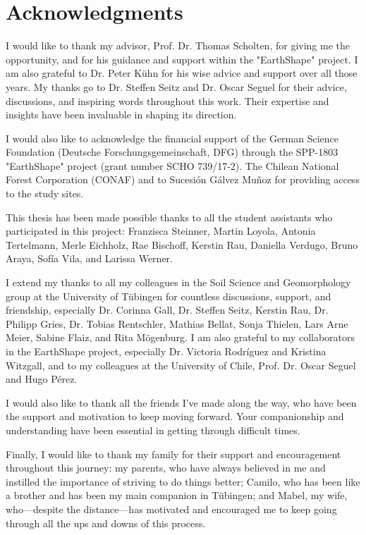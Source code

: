 \chapter*{Acknowledgments}

I would like to thank my advisor, Prof. Dr. Thomas Scholten, for giving me the opportunity, and for his guidance and support within the "EarthShape" project. I am also grateful to Dr. Peter Kühn for his wise advice and support over all those years. My thanks go to Dr. Steffen Seitz and Dr. Oscar Seguel for their advice, discussions, and inspiring words throughout this work. Their expertise and insights have been invaluable in shaping its direction.

I would also like to acknowledge the financial support of the German Science Foundation (Deutsche Forschungsgemeinschaft, DFG) through the SPP-1803 "EarthShape" project (grant number SCHO 739/17-2). The Chilean National Forest Corporation (CONAF) and to Sucesión Gálvez Muñoz for providing access to the study sites.

This thesis has been made possible thanks to all the student assistants who participated in this project: Franzisca Steinner, Martin Loyola, Antonia Tertelmann, Merle Eichholz, Rae Bischoff, Kerstin Rau, Daniella Verdugo, Bruno Araya, Sofía Vila, and Larissa Werner.

I extend my thanks to all my colleagues in the Soil Science and Geomorphology group at the University of Tübingen for countless discussions, support, and friendship, especially Dr. Corinna Gall, Dr. Steffen Seitz, Kerstin Rau, Dr. Philipp Gries, Dr. Tobias Rentschler, Mathias Bellat, Sonja Thielen, Lars Arne Meier, Sabine Flaiz, and Rita Mögenburg. I am also grateful to my collaborators in the EarthShape project, especially Dr. Victoria Rodríguez and Kristina Witzgall, and to my colleagues at the University of Chile, Prof. Dr. Oscar Seguel and Hugo Pérez.

I would also like to thank all the friends I've made along the way, who have been the support and motivation to keep moving forward. Your companionship and understanding have been essential in getting through difficult times.

Finally, I would like to thank my family for their support and encouragement throughout this journey: my parents, who have always believed in me and instilled the importance of striving to do things better; Camilo, who has been like a brother and has been my main companion in Tübingen; and Mabel, my wife, who—despite the distance—has motivated and encouraged me to keep going through all the ups and downs of this process.
